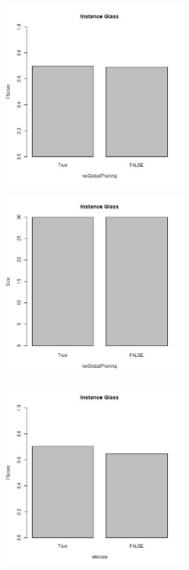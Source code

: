 \documentclass[12pt,a4paper]{article}
\begin{document}
\begin{figure}[H]
\centering
\includegraphics[width=0.7\textwidth]{glassFScoreNoGlobalPruning.jpg}
\end{figure}

\begin{figure}[H]
\centering
\includegraphics[width=0.7\textwidth]{glassSizeNoGlobalPruning.jpg}
\end{figure}

\begin{figure}[H]
\centering
\includegraphics[width=0.7\textwidth]{glassFScoreWinnow.jpg}
\end{figure}
\end{document}
